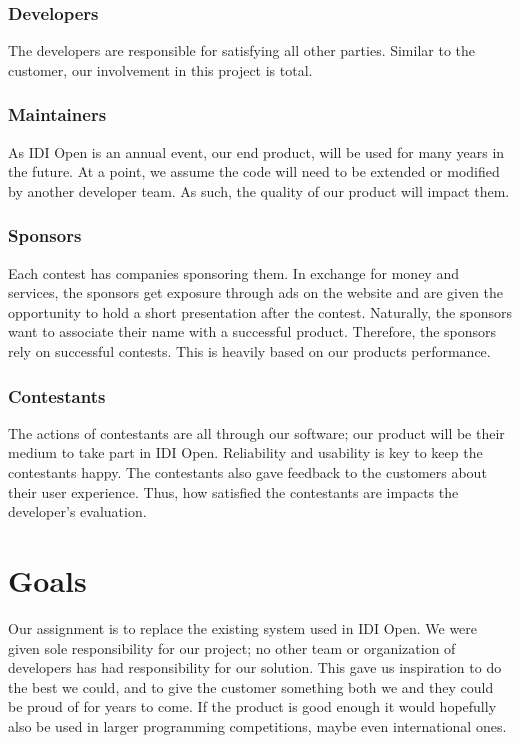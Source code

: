 \subsubsection{Developers}
The developers are responsible for satisfying all other parties. Similar
to the customer, our involvement in this project is total.

\subsubsection{Maintainers}
As IDI Open is an annual event, our end product, will be used for many 
years in the future. At a point, we assume the code will need to be 
extended or modified by another developer team. 
As such, the quality of our product will impact them.

\subsubsection{Sponsors}
Each contest has companies sponsoring them. In exchange for money and
services, the sponsors get exposure through ads on the website and are
given the opportunity to hold a short presentation after the contest. Naturally, the
sponsors want to associate their name with a successful product.
Therefore, the sponsors rely on successful contests. This is
heavily based on our products performance.

\subsubsection{Contestants}
The actions of contestants are all through our software; our product will be
their medium to take part in IDI Open. Reliability and usability is key to keep
the contestants happy. The contestants also gave feedback to the customers
about their user experience. Thus, how satisfied the contestants are impacts
the developer's evaluation.

\section{Goals}
Our assignment is to replace the existing system used in IDI Open. We were
given sole responsibility for our project; no other team or organization of
developers has had responsibility for our solution. This gave us inspiration to
do the best we could, and to give the customer something both we and they could
be proud of for years to come. If the product is good enough it would
hopefully also be used in larger programming competitions, maybe even
international ones.

